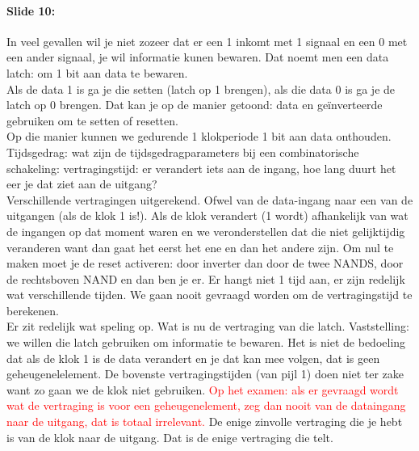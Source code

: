 \documentclass[10pt,a4paper]{book}
\begin{document}
\paragraph{Slide 10:} In veel gevallen wil je niet zozeer dat er een 1 inkomt met 1 signaal en een 0 met een ander signaal, je wil informatie kunen bewaren. Dat noemt men een data latch: om 1 bit aan data te bewaren.\\
Als de data 1 is ga je die setten (latch op 1 brengen), als die data 0 is ga je de latch op 0 brengen. Dat kan je op de manier getoond: data en ge\"inverteerde gebruiken om te setten of resetten.\\
Op die manier kunnen we gedurende 1 klokperiode 1 bit aan data onthouden.\\
Tijdsgedrag: wat zijn de tijdsgedragparameters bij een combinatorische schakeling: vertragingstijd: er verandert iets aan de ingang, hoe lang duurt het eer je dat ziet aan de uitgang?\\
Verschillende vertragingen uitgerekend. Ofwel van de data-ingang naar een van de uitgangen (als de klok 1 is!). Als de klok verandert (1 wordt) afhankelijk van wat de ingangen op dat moment waren en we veronderstellen dat die niet gelijktijdig veranderen want dan gaat het eerst het ene en dan het andere zijn. Om nul te maken moet je de reset activeren: door inverter dan door de twee NANDS, door de rechtsboven NAND en dan ben je er. Er hangt niet 1 tijd aan, er zijn redelijk wat verschillende tijden. We gaan nooit gevraagd worden om de vertragingstijd te berekenen.\\
Er zit redelijk wat speling op. Wat is nu de vertraging van die latch. Vaststelling: we willen die latch gebruiken om informatie te bewaren. Het is niet de bedoeling dat als de klok 1 is de data verandert en je dat kan mee volgen, dat is geen geheugenelelement. De bovenste vertragingstijden (van pijl 1) doen niet ter zake want zo gaan we de klok niet gebruiken. \textcolor{red}{Op het examen: als er gevraagd wordt wat de vertraging is voor een geheugenelement, zeg dan nooit van de dataingang naar de uitgang, dat is totaal irrelevant.} De enige zinvolle vertraging die je hebt is van de klok naar de uitgang. Dat is de enige vertraging die telt. 
\end{document}
